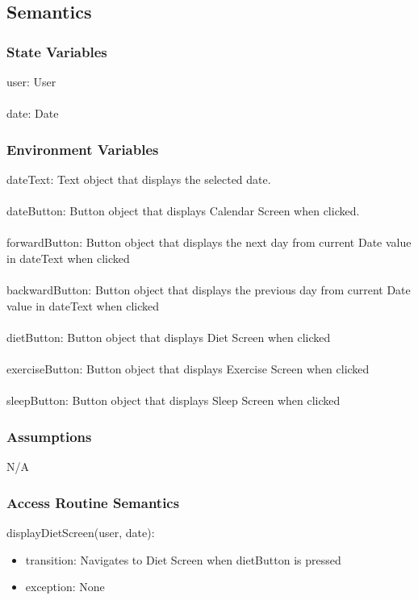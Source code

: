 \documentclass[12pt, titlepage]{article}
\begin{document}
\subsection{Semantics}

\subsubsection{State Variables}

user: User\\\\
date: Date


\subsubsection{Environment Variables}

dateText: Text object that displays the selected date.\\\\
dateButton: Button object that displays Calendar Screen when clicked.\\\\
forwardButton: Button object that displays the next day from current Date value in dateText when clicked\\\\
backwardButton: Button object that displays the previous day from current Date value in dateText when clicked\\\\
dietButton: Button object that displays Diet Screen when clicked\\\\
exerciseButton: Button object that displays Exercise Screen when clicked\\\\
sleepButton: Button object that displays Sleep Screen when clicked

\subsubsection{Assumptions}

N/A

\subsubsection{Access Routine Semantics}

\noindent displayDietScreen(user, date):
\begin{itemize}
	\item transition: Navigates to Diet Screen when dietButton is pressed 
	\item exception: None 
\end{itemize}
\end{document}
